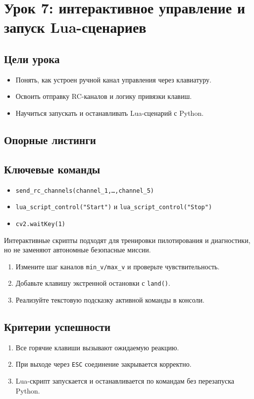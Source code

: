 \section{Урок 7: интерактивное управление и запуск Lua-сценариев}

\subsection{Цели урока}
\begin{itemize}
\item Понять, как устроен ручной канал управления через клавиатуру.
\item Освоить отправку RC-каналов и логику привязки клавиш.
\item Научиться запускать и останавливать Lua-сценарий с Python.
\end{itemize}

\subsection{Опорные листинги}



\subsection{Ключевые команды}
\begin{itemize}
\item \texttt{send\_rc\_channels(channel\_1,\dots,channel\_5)}
\item \texttt{lua\_script\_control("Start")} и \texttt{lua\_script\_control("Stop")}
\item \texttt{cv2.waitKey(1)}
\end{itemize}

\begin{warnbox}
Интерактивные скрипты подходят для тренировки пилотирования и диагностики, но не заменяют автономные безопасные миссии.
\end{warnbox}

\begin{taskbox}
\begin{enumerate}
\item Измените шаг каналов \texttt{min\_v/max\_v} и проверьте чувствительность.
\item Добавьте клавишу экстренной остановки с \texttt{land()}.
\item Реализуйте текстовую подсказку активной команды в консоли.
\end{enumerate}
\end{taskbox}

\subsection{Критерии успешности}
\begin{enumerate}
\item Все горячие клавиши вызывают ожидаемую реакцию.
\item При выходе через \texttt{ESC} соединение закрывается корректно.
\item Lua-скрипт запускается и останавливается по командам без перезапуска Python.
\end{enumerate}
